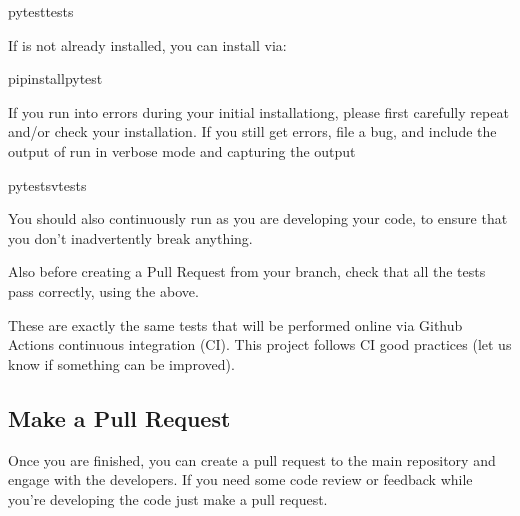 \documentclass[letterpaper,10pt,english,openany,oneside]{sphinxmanual}
\begin{document}
\begin{sphinxVerbatim}[commandchars=\\\{\}]
pytesttests
\end{sphinxVerbatim}

\sphinxAtStartPar
If  is not already installed, you can install via:

\begin{sphinxVerbatim}[commandchars=\\\{\}]
pipinstallpytest
\end{sphinxVerbatim}

\sphinxAtStartPar
If you run into errors during your initial installationg, please first
carefully repeat and/or check your installation. If you still get
errors, file a bug, and include the output of  run in
verbose mode and capturing the output

\begin{sphinxVerbatim}[commandchars=\\\{\}]
pytest\PYGZhy{}s\PYGZhy{}vtests
\end{sphinxVerbatim}

\sphinxAtStartPar
You should also continuously run  as you are developing your
code, to ensure that you don’t inadvertently break anything.

\sphinxAtStartPar
Also before creating a Pull Request from your branch, check that all
the tests pass correctly, using the above.

\sphinxAtStartPar
These are exactly the same tests that will be performed online via
Github Actions continuous integration (CI).  This project follows CI
good practices (let us know if something can be improved).


\subsection{Make a Pull Request}
\label{\detokenize{docs/guide-chapter-contributing:make-a-pull-request}}
\sphinxAtStartPar
Once you are finished, you can create a pull request to the main
repository and engage with the developers.  If you need some code
review or feedback while you’re developing the code just make a pull
request.

\sphinxAtStartPar
{} {\hyperref[\detokenize{docs/guide-chapter-contributing:run-unit-tests-with-pytest}]{}} 
\end{document}
